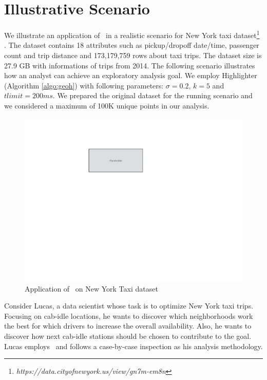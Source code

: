 \section{Illustrative Scenario}\label{sec:scenarios}
We illustrate an application of \framework\ in a realistic scenario for New York taxi dataset\footnote{\it https://data.cityofnewyork.us/view/gn7m-em8n} \cite{ferreira2013visual,FreireCVZ16}. The dataset contains 18 attributes such as pickup/dropoff date/time, passenger count and trip distance and 173,179,759 rows about taxi trips. The dataset size is 27.9 GB with informations of trips from 2014.  The following scenario illustrates how an analyst can achieve an exploratory analysis goal. We employ {\sc Highlighter} (Algorithm \ref{algo:geoh}) with following parameters: $\sigma = 0.2$, $k = 5$ and $tlimit = 200ms$. We prepared the original dataset for the running scenario and we considered a maximum of  100K unique points in our analysis. 

\begin{figure}
  \centering
  \includegraphics[width=\columnwidth]{figs/placeholder}
\caption{Application of \framework\ on New York Taxi dataset}
\label{fig:app}
\end{figure}

\vspace{5pt}
Consider Lucas, a data scientist whose task is to optimize New York taxi trips. Focusing on cab-idle locations, he wants to discover which neighborhoods work the best for which drivers to increase the overall availability. Also, he wants to discover how next cab-idle stations should be chosen to contribute to the goal. Lucas employs \framework\ and follows a case-by-case inspection as his analysis methodology.

